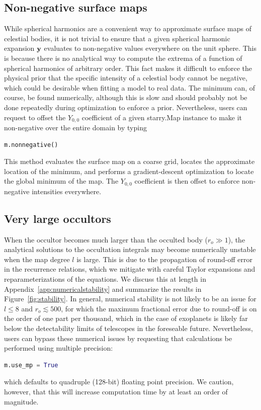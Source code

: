\documentclass[modern]{aastex61}
\begin{document}
\subsection{Non-negative surface maps}
While spherical harmonics are a convenient way to approximate surface
maps of celestial bodies, it is not trivial to ensure
that a given spherical harmonic expansion ${\mathbf{y}}$ evaluates to
non-negative values everywhere on the unit sphere. This is because
there is no analytical way to compute the extrema of a function of
spherical harmonics of arbitrary order.
This fact makes it difficult to enforce the physical prior that the
specific intensity of a celestial body cannot be negative, which
could be desirable when fitting a model to real data. The minimum
can, of course, be found numerically, although this is slow and
should probably not be done repeatedly during optimization to
enforce a prior. Nevertheless, users can request to offset
the $Y_{0,0}$ coefficient of a given \textsf{starry.Map} instance
to make it non-negative over
the entire domain by typing
%
\begin{lstlisting}[language=Python,firstnumber=last]
m.nonnegative()
\end{lstlisting}
%
This method evaluates the surface map on a coarse grid, locates the
approximate location of the minimum, and performs a gradient-descent
optimization to locate the global minimum of the map. The
$Y_{0,0}$ coefficient is then offset to enforce non-negative
intensities everywhere.

\subsection{Very large occultors}
When the occultor becomes much larger than the occulted body ($r_o \gg 1$),
the analytical solutions to the occultation integrals may become numerically
unstable when the map degree $l$ is large. This is due to the propagation of
round-off error in the recurrence relations, which we mitigate
with careful Taylor expansions and reparameterizations of the equations.
We discuss this at length in Appendix~\ref{app:numericalstability} and summarize
the results in Figure~\ref{fig:stability}. In general, numerical stability is
not likely to be an issue for $l \leq 8$ and $r_o \lesssim 500$, for which
the maximum fractional error due to round-off is on the order of one part
per thousand, which in the case of exoplanets is likely far below the
detectability limits of telescopes in the foreseable future. Nevertheless, users
can bypass these numerical issues by requesting that calculations be performed
using multiple precision:
%
\begin{lstlisting}[language=Python,firstnumber=last]
m.use_mp = True
\end{lstlisting}
%
which defaults to quadruple (128-bit) floating point precision. We caution, however,
that this will increase computation time by at least an order of magnitude.
\end{document}
